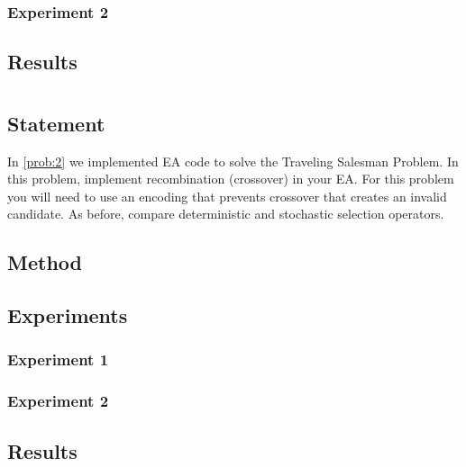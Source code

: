 \documentclass{article}
\begin{document}
\subsubsection{Experiment 2}

\subsection{Results}

\section{}\label{prob:3}
\subsection{Statement}
In \autoref{prob:2} we implemented EA code to solve the Traveling Salesman Problem. In this
problem, implement recombination (crossover) in your EA. For this problem you will need to use an
encoding that prevents crossover that creates an invalid candidate. As before, compare
deterministic and stochastic selection operators.

\subsection{Method}

\subsection{Experiments}

\subsubsection{Experiment 1}
\subsubsection{Experiment 2}

\subsection{Results}


{}
\end{document}
